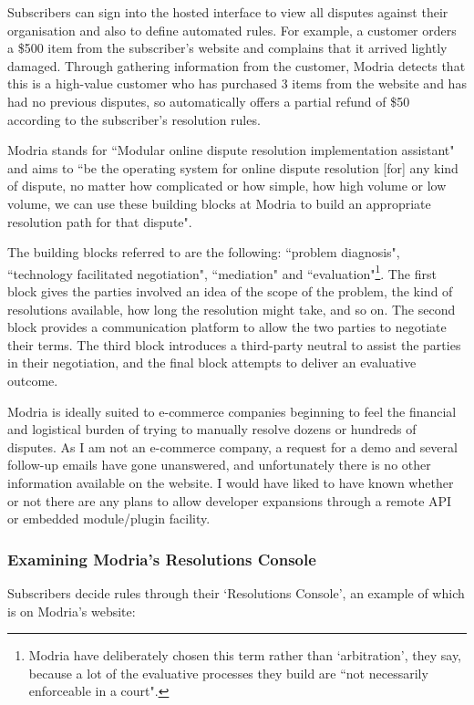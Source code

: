 Subscribers can sign into the hosted interface to view all disputes against their organisation and also to define automated rules. For example, a customer orders a \$500 item from the subscriber's website and complains that it arrived lightly damaged. Through gathering information from the customer, Modria detects that this is a high-value customer who has purchased 3 items from the website and has had no previous disputes, so automatically offers a partial refund of \$50 according to the subscriber's resolution rules.

Modria stands for ``Modular online dispute resolution implementation assistant" and aims to ``be the operating system for online dispute resolution [for] any kind of dispute, no matter how complicated or how simple, how high volume or low volume, we can use these building blocks at Modria to build an appropriate resolution path for that dispute".\cite{modria:interview}

The building blocks referred to are the following: ``problem diagnosis", ``technology facilitated negotiation", ``mediation" and ``evaluation"\footnote{Modria have deliberately chosen this term rather than `arbitration', they say, because a lot of the evaluative processes they build are ``not necessarily enforceable in a court".}. The first block gives the parties involved an idea of the scope of the problem, the kind of resolutions available, how long the resolution might take, and so on. The second block provides a communication platform to allow the two parties to negotiate their terms. The third block introduces a third-party neutral to assist the parties in their negotiation, and the final block attempts to deliver an evaluative outcome.

Modria is ideally suited to e-commerce companies beginning to feel the financial and logistical burden of trying to manually resolve dozens or hundreds of disputes. As I am not an e-commerce company, a request for a demo and several follow-up emails have gone unanswered, and unfortunately there is no other information available on the website. I would have liked to have known whether or not there are any plans to allow developer expansions through a remote API or embedded module/plugin facility.

\subsubsection{Examining Modria's Resolutions Console}

Subscribers decide rules through their `Resolutions Console', an example of which is on Modria's website:~\cite{modria:product}

